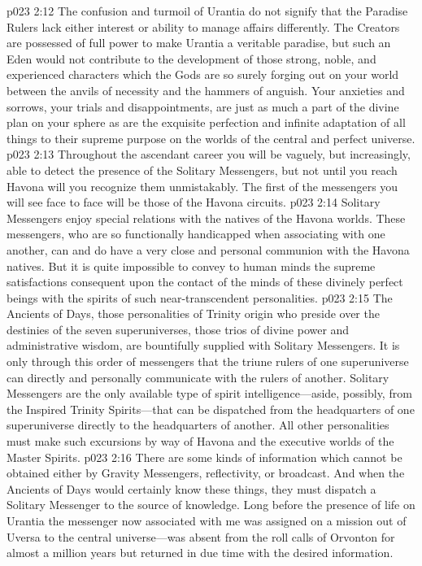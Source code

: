 \vs p023 2:12 The confusion and turmoil of Urantia do not signify that the Paradise Rulers lack either interest or ability to manage affairs differently. The Creators are possessed of full power to make Urantia a veritable paradise, but such an Eden would not contribute to the development of those strong, noble, and experienced characters which the Gods are so surely forging out on your world between the anvils of necessity and the hammers of anguish. Your anxieties and sorrows, your trials and disappointments, are just as much a part of the divine plan on your sphere as are the exquisite perfection and infinite adaptation of all things to their supreme purpose on the worlds of the central and perfect universe.
\vs p023 2:13 \bibnobreakspace {} Throughout the ascendant career you will be vaguely, but increasingly, able to detect the presence of the Solitary Messengers, but not until you reach Havona will you recognize them unmistakably. The first of the messengers you will see face to face will be those of the Havona circuits.
\vs p023 2:14 Solitary Messengers enjoy special relations with the natives of the Havona worlds. These messengers, who are so functionally handicapped when associating with one another, can and do have a very close and personal communion with the Havona natives. But it is quite impossible to convey to human minds the supreme satisfactions consequent upon the contact of the minds of these divinely perfect beings with the spirits of such near\hyp{}transcendent personalities.
\pc \vs p023 2:15 \bibnobreakspace {} The Ancients of Days, those personalities of Trinity origin who preside over the destinies of the seven superuniverses, those trios of divine power and administrative wisdom, are bountifully supplied with Solitary Messengers. It is only through this order of messengers that the triune rulers of one superuniverse can directly and personally communicate with the rulers of another. Solitary Messengers are the only available type of spirit intelligence---aside, possibly, from the Inspired Trinity Spirits---that can be dispatched from the headquarters of one superuniverse directly to the headquarters of another. All other personalities must make such excursions by way of Havona and the executive worlds of the Master Spirits.
\vs p023 2:16 There are some kinds of information which cannot be obtained either by Gravity Messengers, reflectivity, or broadcast. And when the Ancients of Days would certainly know these things, they must dispatch a Solitary Messenger to the source of knowledge. Long before the presence of life on Urantia the messenger now associated with me was assigned on a mission out of Uversa to the central universe---was absent from the roll calls of Orvonton for almost a million years but returned in due time with the desired information.
